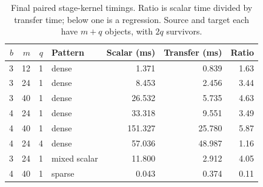 \begin{table}[htbp]
\centering\small
\begin{tabular}{@{}rrrlrrr@{}}\toprule
$b$ & $m$ & $q$ & Pattern & Scalar (ms) & Transfer (ms) & Ratio\\\midrule
3 & 12 & 1 & dense & 1.371 & 0.839 & 1.63\\
3 & 24 & 1 & dense & 8.453 & 2.456 & 3.44\\
3 & 40 & 1 & dense & 26.532 & 5.735 & 4.63\\
4 & 24 & 1 & dense & 33.318 & 9.551 & 3.49\\
4 & 40 & 1 & dense & 151.327 & 25.780 & 5.87\\
4 & 24 & 4 & dense & 57.036 & 48.987 & 1.16\\
3 & 24 & 1 & mixed scalar & 11.800 & 2.912 & 4.05\\
4 & 40 & 1 & sparse & 0.043 & 0.374 & 0.11\\
\bottomrule\end{tabular}
\caption{Final paired stage-kernel timings. Ratio is scalar time divided by transfer time; below one is a regression. Source and target each have $m+q$ objects, with $2q$ survivors.}
\label{tab:matrix}
\end{table}
